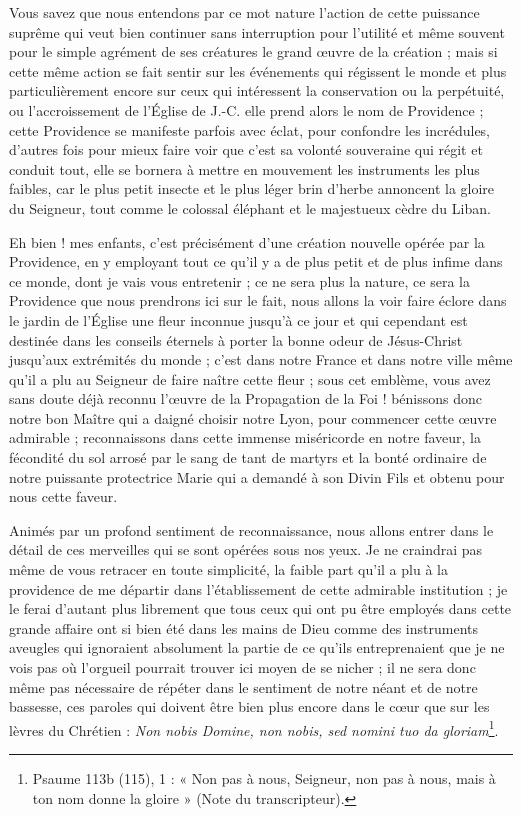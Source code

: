 \documentclass[11pt,a4paper]{report}
\begin{document}
Vous savez que nous entendons par ce mot nature l'action de cette puissance suprême qui veut bien continuer sans interruption pour l'utilité et même souvent pour le simple agrément de ses créatures le grand œuvre de la création ; mais si cette même action se fait sentir sur les événements qui régissent le monde et plus particulièrement encore sur ceux qui intéressent la conservation ou la perpétuité, ou l'accroissement de l'Église de J.-C. elle prend alors le nom de Providence ; cette Providence se manifeste parfois avec éclat, pour confondre les incrédules, d'autres fois pour mieux faire voir que c'est sa volonté souveraine qui régit et conduit tout, elle se bornera à mettre en mouvement les instruments les plus faibles, car le plus petit insecte et le plus léger brin d'herbe annoncent la gloire du Seigneur, tout comme le colossal éléphant et le majestueux cèdre du Liban.

Eh bien ! mes enfants, c'est précisément d'une création nouvelle opérée par la Providence, en y employant tout ce qu'il y a de plus petit et de plus infime dans ce monde, dont je vais vous entretenir ; ce ne sera plus la nature, ce sera la Providence que nous prendrons ici sur le fait, nous allons la voir faire éclore dans le jardin de l'Église une fleur inconnue jusqu'à ce jour et qui cependant est destinée dans les conseils éternels à porter la bonne odeur de Jésus-Christ jusqu'aux extrémités du monde ; c'est dans notre France et dans notre ville même qu'il a plu au Seigneur de faire naître cette fleur ; sous cet emblème, vous avez sans doute déjà reconnu l'œuvre de la Propagation de la Foi ! bénissons donc notre bon Maître qui a daigné choisir notre Lyon, pour commencer cette œuvre admirable ; reconnaissons dans cette immense miséricorde en notre faveur, la fécondité du sol arrosé par le sang de tant de martyrs et la bonté ordinaire de notre puissante protectrice Marie qui a demandé à son Divin Fils et obtenu pour nous cette faveur.

Animés par un profond sentiment de reconnaissance, nous allons entrer dans le détail de ces merveilles qui se sont opérées sous nos yeux. Je ne craindrai pas même de vous retracer en toute simplicité, la faible part qu'il a plu à la providence de me départir dans l'établissement de cette admirable institution ; je le ferai d'autant plus librement que tous ceux qui ont pu être employés dans cette grande affaire ont si bien été dans les mains de Dieu comme des instruments aveugles qui ignoraient absolument la partie de ce qu'ils entreprenaient que je ne vois pas où l'orgueil pourrait trouver ici moyen de se nicher ; il ne sera donc même pas nécessaire de répéter dans le sentiment de notre néant et de notre bassesse, ces paroles qui doivent être bien plus encore dans le cœur que sur les lèvres du Chrétien : \textit{Non nobis Domine, non nobis, sed nomini tuo da gloriam}\footnote{Psaume 113b (115), 1 : « Non pas à nous, Seigneur, non pas à nous, mais à ton nom donne la gloire » (Note du transcripteur).}.
\end{document}
